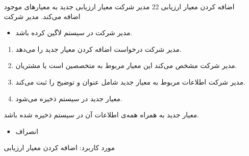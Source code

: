 {
\usecase
{
	 اضافه کردن معیار ارزیابی
}
{22}
{
مدیر شرکت معیار ارزیابی جدید به معیارهای موجود اضافه می‌کند.
}
{
مدیر شرکت
}
{
}
{
	\begin{itemize}
	\vspace*{-0.6cm}
	\item 
	مدیر شرکت در سیستم لاگین کرده باشد.
\end{itemize}	
}
{
	\vspace*{-0.6cm}
\begin{enumerate}
	\item
	مدیر شرکت درخواست اضافه کردن معیار جدید را می‌دهد.
	\item
	مدیر شرکت مشخص می‌کند این معیار مربوط به متخصصین است یا مشتریان.
	\item
		مدیر شرکت اطلاعات مربوط به معیار جدید شامل عنوان و توضیح را ثبت می‌کند.
		\item
		معیار جدید در سیستم ذخیره می‌شود.
\end{enumerate}
}
{
معیار جدید به همراه همه‌ی اطلاعات آن در سیستم ذخیره شده باشد.
}
{
	\begin{itemize}
		\vspace*{-0.6cm}
		\item 
		انصراف
	\end{itemize}
}
{
	مورد کاربرد: اضافه کردن معیار ارزیابی
}



}



